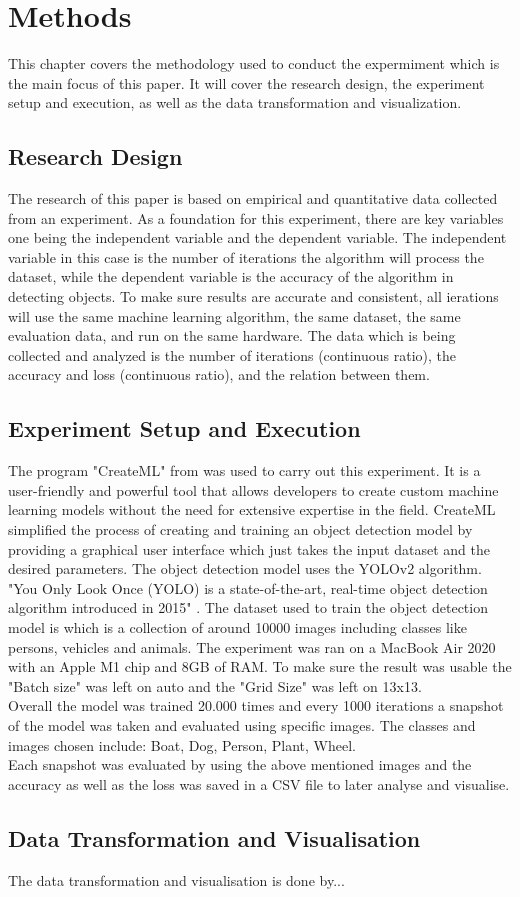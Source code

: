 \section{Methods}
This chapter covers the methodology used to conduct the expermiment which is the main focus of this paper.
It will cover the research design, the experiment setup and execution, as well as the data transformation 
and visualization.

\subsection{Research Design}
The research of this paper is based on empirical and quantitative data collected from an experiment.
As a foundation for this experiment, there are key variables one being the independent variable and the 
dependent variable. The independent variable in this case is the number of iterations the algorithm will
process the dataset, while the dependent variable is the accuracy of the algorithm in detecting objects.
To make sure results are accurate and consistent, all ierations will use the same machine learning algorithm,
the same dataset, the same evaluation data, and run on the same hardware.
The data which is being collected and analyzed is the number of iterations (continuous ratio), the accuracy
and loss (continuous ratio), and the relation between them.

\subsection{Experiment Setup and Execution}
The program "CreateML" from \cite{Apple} was used to carry out this experiment. It is a user-friendly and powerful 
tool that allows developers to create custom machine learning models without the need for extensive expertise in the field.
CreateML simplified the process of creating and training an object detection model by providing a graphical user interface which 
just takes the input dataset and the desired parameters. The object detection model uses the YOLOv2 \parencite{Jain} algorithm.
"You Only Look Once (YOLO) is a state-of-the-art, real-time object detection algorithm introduced in 2015" \parencite{Keita2022}. 
The dataset used to train the object detection model is  which is a collection of around 10000 images including classes
like persons, vehicles and animals. The experiment was ran on a MacBook Air 2020 with an Apple M1 chip and 8GB of RAM. To make sure the 
result was usable the "Batch size" was left on auto and the "Grid Size" was left on 13x13.\\
Overall the model was trained 20.000 times and every 1000 iterations a snapshot of the model was taken and evaluated using
specific images. 
The classes and images chosen include: Boat, Dog, Person, Plant, Wheel.
\\
Each snapshot was evaluated by using the above mentioned images and the accuracy as well as the loss was saved in a CSV file to later 
analyse and visualise.

\subsection{Data Transformation and Visualisation}
The data transformation and visualisation is done by...

